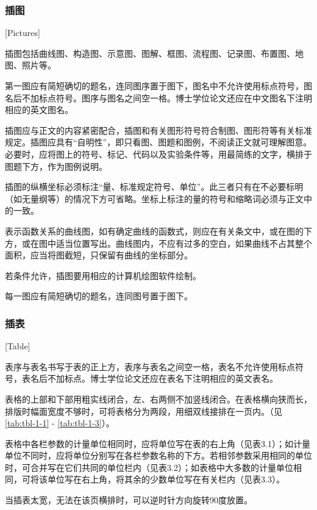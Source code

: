 \subsubsection{插图}[Pictures]

插图包括曲线图、构造图、示意图、图解、框图、流程图、记录图、布置图、地图、照片等。

第一图应有简短确切的题名，连同图序置于图下，图名中不允许使用标点符号，图名后不加标点符号。图序与图名之间空一格。博士学位论文还应在中文图名下注明相应的英文图名。

插图应与正文的内容紧密配合，插图和有关图形符号符合制图、图形符等有关标准规定。插图应具有“自明性”，即只看图、图题和图例，不阅读正文就可理解图意。必要时，应将图上的符号、标记、代码以及实验条件等，用最简练的文字，横排于图题下方，作为图例说明。

插图的纵横坐标必须标注“量、标准规定符号、单位”。此三者只有在不必要标明（如无量纲等）的情况下方可省略。坐标上标注的量的符号和缩略词必须与正文中的一致。

表示函数关系的曲线图，如有确定曲线的函数式，则应在有关条文中，或在图的下方，或在图中适当位置写出。曲线图内，不应有过多的空白，如果曲线不占其整个面积，应当将图截短，只保留有曲线的坐标部分。

若条件允许，插图要用相应的计算机绘图软件绘制。

每一图应有简短确切的题名，连同图号置于图下。

\subsubsection{插表}[Table]

表序与表名书写于表的正上方，表序与表名之间空一格，表名不允许使用标点符号，表名后不加标点。博士学位论文还应在表名下注明相应的英文表名。

表格的上部和下部用粗实线闭合，左、右两侧不加竖线闭合。在表格横向狭而长，排版时幅面宽度不够时，可将表格分为两段，用细双线接排在一页内。（见\ref{tab:tbl-1-1} - \ref{tab:tbl-1-3}）。

表格中各栏参数的计量单位相同时，应将单位写在表的右上角（见表3.1）；如计量单位不同时，应将单位分别写在各栏参数名称的下方。若相邻参数采用相同的单位时，可合并写在它们共同的单位栏内（见表3.2）；如表格中大多数的计量单位相同，可将该单位写在右上角，将其余的少数单位写在有关栏内（见表3.3）。

当插表太宽，无法在该页横排时，可以逆时针方向旋转90度放置。

